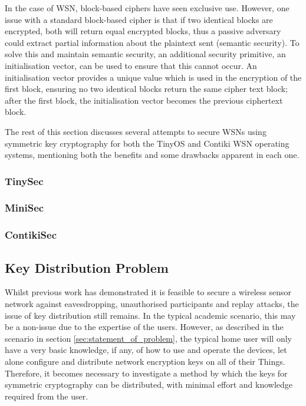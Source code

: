\documentclass{mprop}
\begin{document}
In the case of WSN, block-based ciphers have seen exclusive use. However, one issue with a standard block-based cipher is that if two identical blocks are encrypted, both will return equal encrypted blocks, thus a passive adversary could extract partial information about the plaintext sent (semantic security). To solve this and maintain semantic security, an additional security primitive, an initialisation vector, can be used to ensure that this cannot occur. An initialisation vector provides a unique value which is used in the encryption of the first block, ensuring no two identical blocks return the same cipher text block; after the first block, the initialisation vector becomes the previous ciphertext block.

The rest of this section discusses several attempts to secure WSNs using symmetric key cryptography for both the TinyOS and Contiki WSN operating systems, mentioning both the benefits and some drawbacks apparent in each one. 


\subsubsection{TinySec} %
\label{ssub:tinysec}


\subsubsection{MiniSec} %
\label{ssub:minisec}


\subsubsection{ContikiSec} %
\label{ssub:contikisec}


\subsection{Key Distribution Problem} %
\label{sub:key_distribution_problem}

Whilst previous work has demonstrated it is feasible to secure a wireless sensor network against eavesdropping, unauthorised participants and replay attacks, the issue of key distribution still remains.
In the typical academic scenario, this may be a non-issue due to the expertise of the users. However, as described in the scenario in section \ref{sec:statement_of_problem}, the typical home user will only have a very basic knowledge, if any, of how to use and operate the devices, let alone configure and distribute network encryption keys on all of their Things. Therefore, it becomes necessary to investigate a method by which the keys for symmetric cryptography can be distributed, with minimal effort and knowledge required from the user.
\end{document}
